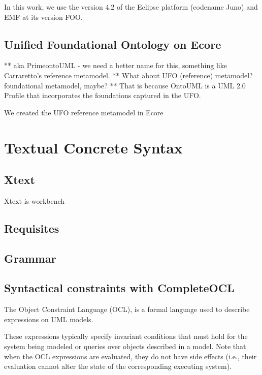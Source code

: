 \documentclass[
  10pt,				%
  oneside,
  a4paper,			%
  brazilian,
  english
]{abntex2}
\begin{document}
In this work, we use the version 4.2 of the Eclipse platform (codename Juno) and
EMF at its version FOO.

\section{Unified Foundational Ontology on Ecore}


** aka PrimeontoUML - we need a better name for this, something like Carraretto's reference metamodel.
** What about UFO (reference) metamodel? foundational metamodel, maybe?
** That is because OntoUML is a UML 2.0 Profile that incorporates the foundations captured in the UFO.

We created the UFO reference metamodel in Ecore

\chapter{Textual Concrete Syntax}

\section{Xtext}

Xtext is workbench

\section{Requisites}

\section{Grammar}

\section{Syntactical constraints with CompleteOCL}

The Object Constraint Language (OCL)\cite{OCL20}, is a formal language used to
describe expressions on UML models.

These expressions typically specify invariant conditions that must hold for the
system being modeled or queries over objects described in a model. Note that when
the OCL expressions are evaluated, they do not have side effects (i.e., their
evaluation cannot alter the state of the corresponding executing system).
\end{document}
